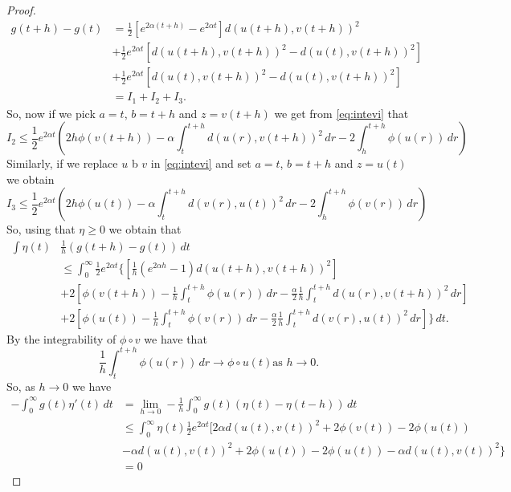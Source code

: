 \documentclass[a4paper,11pt, leqno]{scrreprt} %
\renewcommand{\leq}{\leqslant}
\renewcommand{\leq}{\leqslant}
\renewcommand{\geq}{\geqslant}
\theoremstyle{change}
\theoremstyle{nonumberplain}
\newtheorem{proof}{Proof}
\begin{document}
\begin{proof}
\begin{equation*}
\begin{split}
  g(t + h) - g(t) &= \frac12 [e^{2 \alpha (t + h)} - e^{2 \alpha t}]
  d(u(t + h), v(t + h))^2\\
  &+ \frac12 e^{2 \alpha t} [d(u(t + h), v(t + h))^2 - d(u(t), v(t +
  h))^2]\\
  &+ \frac12 e^{2 \alpha t} [d(u(t), v(t + h))^2 - d(u(t), v(t +
  h))^2]\\
  &= I_1 + I_2 + I_3.
\end{split}
\end{equation*}
So, now if we pick $a = t$, $b = t + h$ and $z = v(t + h)$ we get from
\eqref{eq:intevi} that 
\begin{equation}
I_2 \leq \frac12 e^{2 \alpha t} \left ( 2 h \phi(v(t + h)) - \alpha
  \int_t^{t + h} d(u(r), v(t + h))^2 \, dr - 2 \int_h^{t + h}
  \phi(u(r)) \, dr \right )
\end{equation}
Similarly, if we replace $u$ b $v$ in \eqref{eq:intevi} and set $a =
t$, $b = t + h$ and $z = u(t)$ we obtain
\begin{equation}
I_3 \leq \frac12 e^{2 \alpha t} \left ( 2 h \phi(u(t)) - \alpha
  \int_t^{t + h} d(v(r), u(t))^2 \, dr - 2 \int_h^{t + h}
  \phi(v(r)) \, dr \right )
\end{equation}
So, using that $\eta \geq 0$ we obtain that
\begin{equation*}
\begin{split}
  \int \eta(t) &\frac1h (g(t + h) - g(t)) \, dt\\
  &\leq \int_0^\infty \frac12 e^{2 \alpha t} \Bigg \{ \left [ \frac1h
    (e^{2 \alpha h} - 1) d(u(t + h), v(t + h))^2 \right ]\\
  &+ 2 \left [ \phi(v(t + h)) - \frac1h \int_t^{t + h} \phi(u(r)) \,
    dr - \frac\alpha2 \frac1h \int_t^{t + h} d(u(r), v(t + h))^2 \, dr
  \right ]\\
  &+ 2 \left [\phi(u(t)) - \frac1h \int_t^{t + h} \phi(v(r)) \, dr -
    \frac\alpha2 \frac1h \int_t^{t + h} d(v(r), u(t))^2 \,dr \right ]
  \Bigg \} \, dt.
\end{split}
\end{equation*}
By the integrability of $\phi \circ v$ we have that
\begin{equation*}
  \frac1h \int_t^{t + h} \phi(u(r)) \, dr \to \phi \circ u(t) \text{
    as $h \to 0$}.
\end{equation*}
So, as $h \to 0$ we have
\begin{align*}
  -\int_0^\infty g(t) \eta'(t) \, dt &= \lim_{h \to 0} -\frac1h
  \int_0^\infty g(t)(\eta(t) - \eta(t - h)) \, dt\\
  &\leq \int_0^\infty \eta(t) \frac12 e^{2 \alpha t} \Big [ 2 \alpha
  d(u(t), v(t))^2 + 2 \phi(v(t)) - 2 \phi(u(t))\\
  &- \alpha d(u(t), v(t))^2 + 2 \phi(u(t)) - 2\phi(u(t)) - \alpha d(u(t), v(t))^2 \Big \}\\
  &= 0
\end{align*}
\end{proof}
\end{document}
